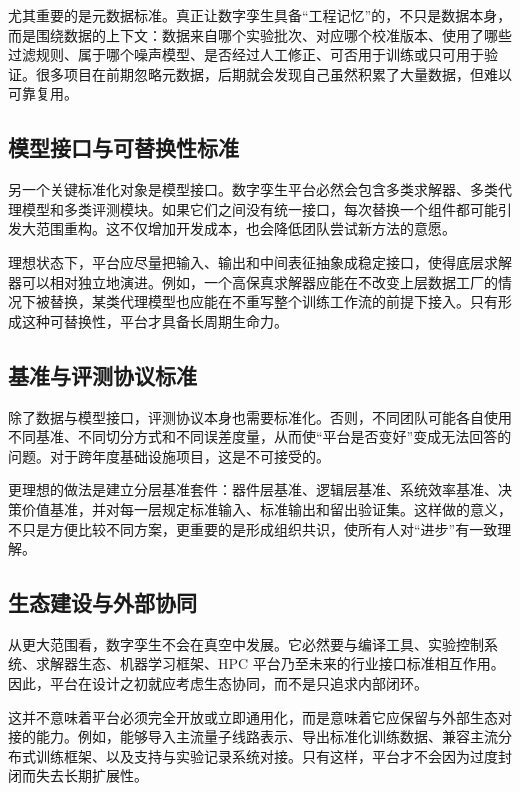 \documentclass[11pt,a4paper]{article}
\begin{document}
尤其重要的是元数据标准。真正让数字孪生具备“工程记忆”的，不只是数据本身，而是围绕数据的上下文：数据来自哪个实验批次、对应哪个校准版本、使用了哪些过滤规则、属于哪个噪声模型、是否经过人工修正、可否用于训练或只可用于验证。很多项目在前期忽略元数据，后期就会发现自己虽然积累了大量数据，但难以可靠复用。

\subsection{模型接口与可替换性标准}

另一个关键标准化对象是模型接口。数字孪生平台必然会包含多类求解器、多类代理模型和多类评测模块。如果它们之间没有统一接口，每次替换一个组件都可能引发大范围重构。这不仅增加开发成本，也会降低团队尝试新方法的意愿。

理想状态下，平台应尽量把输入、输出和中间表征抽象成稳定接口，使得底层求解器可以相对独立地演进。例如，一个高保真求解器应能在不改变上层数据工厂的情况下被替换，某类代理模型也应能在不重写整个训练工作流的前提下接入。只有形成这种可替换性，平台才具备长周期生命力。

\subsection{基准与评测协议标准}

除了数据与模型接口，评测协议本身也需要标准化。否则，不同团队可能各自使用不同基准、不同切分方式和不同误差度量，从而使“平台是否变好”变成无法回答的问题。对于跨年度基础设施项目，这是不可接受的。

更理想的做法是建立分层基准套件：器件层基准、逻辑层基准、系统效率基准、决策价值基准，并对每一层规定标准输入、标准输出和留出验证集。这样做的意义，不只是方便比较不同方案，更重要的是形成组织共识，使所有人对“进步”有一致理解。

\subsection{生态建设与外部协同}

从更大范围看，数字孪生不会在真空中发展。它必然要与编译工具、实验控制系统、求解器生态、机器学习框架、HPC 平台乃至未来的行业接口标准相互作用。因此，平台在设计之初就应考虑生态协同，而不是只追求内部闭环。

这并不意味着平台必须完全开放或立即通用化，而是意味着它应保留与外部生态对接的能力。例如，能够导入主流量子线路表示、导出标准化训练数据、兼容主流分布式训练框架、以及支持与实验记录系统对接。只有这样，平台才不会因为过度封闭而失去长期扩展性。
\end{document}

